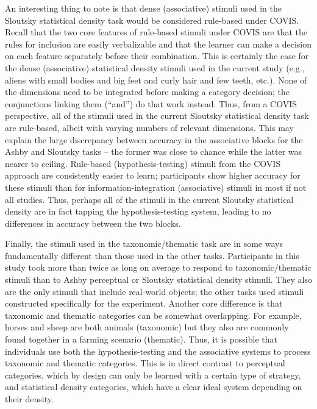\documentclass[../dissertation.tex]{subfiles}
\begin{document}
	An interesting thing to note is that dense (associative) stimuli used in the Sloutsky statistical density task would be considered rule-based under COVIS. Recall that the two core features of rule-based stimuli under COVIS are that the rules for inclusion are easily verbalizable and that the learner can make a decision on each feature separately before their combination. This is certainly the case for the dense (associative) statistical density stimuli used in the current study (e.g., aliens with small bodies and big feet and curly hair and few teeth, etc.). None of the dimensions need to be integrated before making a category decision; the conjunctions linking them (“and”) do that work instead. Thus, from a COVIS perspective, all of the stimuli used in the current Sloutsky statistical density task are rule-based, albeit with varying numbers of relevant dimensions. This may explain the large discrepancy between accuracy in the associative blocks for the Ashby and Sloutsky tasks – the former was close to chance while the latter was nearer to ceiling. Rule-based (hypothesis-testing) stimuli from the COVIS approach are consistently easier to learn; participants show higher accuracy for these stimuli than for information-integration (associative) stimuli in most if not all studies. Thus, perhaps all of the stimuli in the current Sloutsky statistical density are in fact tapping the hypothesis-testing system, leading to no differences in accuracy between the two blocks. \par
	Finally, the stimuli used in the taxonomic/thematic task are in some ways fundamentally different than those used in the other tasks. Participants in this study took more than twice as long on average to respond to taxonomic/thematic stimuli than to Ashby perceptual or Sloutsky statistical density stimuli. They also are the only stimuli that include real-world objects; the other tasks used stimuli constructed specifically for the experiment. Another core difference is that taxonomic and thematic categories can be somewhat overlapping. For example, horses and sheep are both animals (taxonomic) but they also are commonly found together in a farming scenario (thematic). Thus, it is possible that individuals use both the hypothesis-testing and the associative systems to process taxonomic and thematic categories. This is in direct contrast to perceptual categories, which by design can only be learned with a certain type of strategy, and statistical density categories, which have a clear ideal system depending on their density. \par
\end{document}
